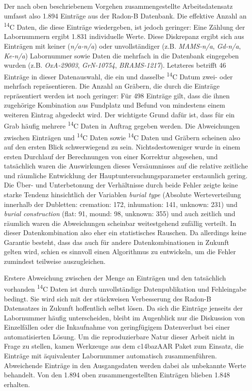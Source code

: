 \documentclass[openany,twoside,twocolumn]{book}
\begin{document}
Der nach oben beschriebenem Vorgehen zusammengestellte Arbeitsdatensatz
umfasst also 1.894 Einträge aus der Radon-B Datenbank. Die effektive
Anzahl an \textsuperscript{14}C Daten, die diese Einträge wiedergeben,
ist jedoch geringer: Eine Zählung der Labornummern ergibt 1.831
individuelle Werte. Diese Diskrepanz ergibt sich aus Einträgen mit
keiner (\emph{n/a-n/a}) oder unvollständiger (z.B. \emph{MAMS-n/a},
\emph{Gd-n/a}, \emph{Ke-n/a}) Labornummer sowie Daten die mehrfach in
die Datenbank eingegeben wurden (z.B. \emph{OxA-29003},
\emph{GrN-10754}, \emph{BRAMS-1217}). Letzteres betrifft 46 Einträge in
dieser Datenauswahl, die ein und dasselbe \textsuperscript{14}C Datum
zwei- oder mehrfach repräsentieren. Die Anzahl an Gräbern, die durch die
Einträge repräsentiert werden ist noch geringer: Für 498 Einträge gilt,
dass die ihnen zugehörige Kombination aus Fundplatz und Befund von
mindestens einem weiteren Eintrag abgedeckt wird. Der wichtigste Grund
dafür ist, dass für ein Grab häufig mehrere \textsuperscript{14}C Daten
in Auftrag gegeben werden. Die Abweichungen zwischen Einträgen und
\textsuperscript{14}C Daten sowie \textsuperscript{14}C Daten und
Gräbern scheinen also auf den ersten Blick schwerwiegend zu sein.
Nichtsdestoweniger wurde in einem ersten Durchlauf der Berechnungen von
einer Korrektur abgesehen, und tatsächlich waren die Auswirkungen dieses
Versäumnisses auf die relative zeitliche und räumliche Entwicklung der
Hauptuntersuchungsparameter erstaunlich gering. Die Über- und
Unterbetonung der Verhältnisse durch beide Fehler zeigte keine starke
Tendenz hinsichtlich der Variablen \emph{burial type} (Absolute
Werteverteilung innerhalb der Dubletten: cremation: 172, inhumation:
141, unknown: 231) und \emph{burial construction} (flat: 91, mound: 98,
unknown: 355) und auch zeitlich und räumlich waren die Abweichungen
scheinbar weitestgehend zufällig verteilt. In dieser Datenkombination
also eher ein statistisches Rauschen. Da allerdings keine Garantie
besteht, dass das auch für andere Datenkombinationen in Zukunft gelten
wird, schien es sinnvoll einen Algorithmus zu entwickeln, um die Fehler
zumindest teilweise auszugleichen.

Erstere Abweichung zwischen der Menge an Einträgen und den tatsächlich
vorhanden \textsuperscript{14}C Daten ist durch unvollständige
Datenpublikation und Fehleingabe bedingt. Sie wird sich mit der
stückweisen Verbesserung des Radon-B Datensatzes in Zukunft hoffentlich
selbst lösen. Da sich die Einträge jenseits der Labornummer häufig
unterscheiden, bleibt im Augenblick nur die Diskussion von Einzelfällen
oder die Inkaufnahme von geringfügigem Datenverlust bei einer
automatisierten Lösung. Um die reproduzierbare Natur dieser Arbeit nicht
in Frage zu stellen, kamen Werkzeuge aus dem c14bazAAR Paket zum
Einsatz, die Einträge mit äquivalenter Labornummer automatisch
zusammenführen. Abweichende Einträge in den Ausgangsdaten werden dabei
als unbekannte Werte behandelt. Von den 1.894 oben zusammengestellten
Einträgen blieben 1.848 erhalten.
\end{document}
